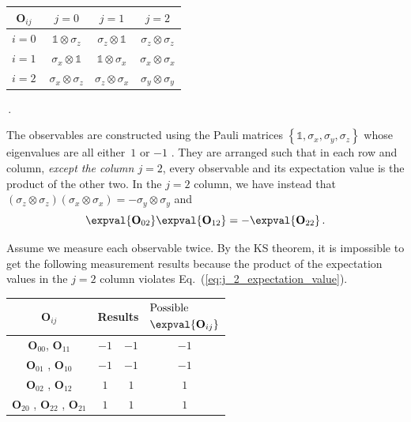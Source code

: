 \documentclass[english,reprint, aps, prl,superscriptaddress, showpacs,
showkeys, longbibliography, amsmath, amssymb, floatfix]{revtex4-1}
\theoremstyle{plain}
\theoremstyle{definition}
\begin{document}
{\renewcommand{\arraystretch}{2}%
\begin{center} 
\begin{tabular}{r|@{\quad}c@{\quad}|@{\quad}c@{\quad}|@{\quad}c@{\quad}|} 
$\mathbf{O}_{ij}$~ & $j=0$ & $j=1$ & $j=2$ \\ 
\hline  
$i=0~$ & $\mathbb{1}\otimes\sigma_{z}$  & $\sigma_{z}\otimes\mathbb{1}$  & $\sigma_{z}\otimes\sigma_{z}$ \tabularnewline 
\hline  
$i=1~$ & $\sigma_{x}\otimes\mathbb{1}$  & $\mathbb{1}\otimes\sigma_{x}$  & $\sigma_{x}\otimes\sigma_{x}$ \tabularnewline 
\hline  
$i=2~$ & $\sigma_{x}\otimes\sigma_{z}$  & $\sigma_{z}\otimes\sigma_{x}$  & $\sigma_{y}\otimes\sigma_{y}$ \tabularnewline 
\hline  
\end{tabular}\,.
\par\end{center} 
}

\noindent The observables are constructed using the Pauli matrices
$\left\{ \mathbb{1},\sigma_{x},\sigma_{y},\sigma_{z}\right\} $ whose
eigenvalues are all either~$1$ or $-1$ \cite{Redhead1987-REDINA,544199,Griffiths2003,Jaeger2007,Mermin2007}.
They are arranged such that in each row and column, \emph{except the
column $j=2$}, every observable and its expectation value is the
product of the other two. In the $j=2$ column, we have instead that
$\left(\sigma_{z}\otimes\sigma_{z}\right)\left(\sigma_{x}\otimes\sigma_{x}\right)=-\sigma_{y}\otimes\sigma_{y}$
and 
\begin{equation}
\expval{\mathbf{O}_{02}}\expval{\mathbf{O}_{12}}=-\expval{\mathbf{O}_{22}}\,.\label{eq:j_2_expectation_value}
\end{equation}

Assume we measure each observable twice. By the KS theorem, it is
impossible to get the following measurement results because the product
of the expectation values in the $j=2$ column violates Eq.~(\ref{eq:j_2_expectation_value}).
\begin{center}
\begin{tabular}{cccc}
\toprule 
\addlinespace
$\mathbf{O}_{ij}$  & \multicolumn{2}{c}{Results} & $\begin{aligned} & \textrm{Possible}\\
 & \expval{\mathbf{O}_{ij}}
\end{aligned}
$\tabularnewline
\midrule
\midrule 
\addlinespace
$\mathbf{O}_{00}$, $\mathbf{O}_{11}$ & $-1$ & $-1$ & $-1$\tabularnewline
\midrule 
\addlinespace
$\mathbf{O}_{01}$ , $\mathbf{O}_{10}$  & $-1$ & $-1$ & $-1$\tabularnewline
\midrule 
\addlinespace
$\mathbf{O}_{02}$ , $\mathbf{O}_{12}$ & $1$ & $1$ & $1$\tabularnewline
\midrule 
\addlinespace
$\mathbf{O}_{20}$ , $\mathbf{O}_{22}$ , $\mathbf{O}_{21}$  & $1$ & $1$ & $1$\tabularnewline
\bottomrule
\end{tabular}
\par\end{center}
\end{document}
